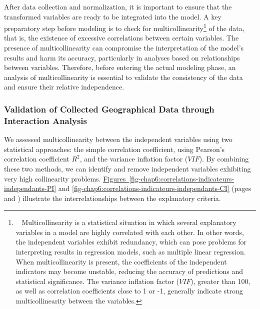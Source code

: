 \begin{refsegment}
After data collection and normalization, it is important to ensure that the transformed variables are ready to be integrated into the model. A key preparatory step before modeling is to check for multicollinearity\footnote{~
    Multicollinearity is a statistical situation in which several explanatory variables in a model are highly correlated with each other. In other words, the independent variables exhibit redundancy, which can pose problems for interpreting results in regression models, such as multiple linear regression. When multicollinearity is present, the coefficients of the independent indicators may become unstable, reducing the accuracy of predictions and statistical significance. The variance inflation factor (\(VIF\)), greater than 100, as well as correlation coefficients close to 1 or -1, generally indicate strong multicollinearity between the variables.
} of the data, that is, the existence of excessive correlations between certain variables. The presence of multicollinearity can compromise the interpretation of the model's results and harm its accuracy, particularly in analyses based on relationships between variables. Therefore, before entering the actual modeling phase, an analysis of multicollinearity is essential to validate the consistency of the data and ensure their relative independence.%

\subsubsection*{Validation of Collected Geographical Data through Interaction Analysis
    \label{chap6:methodologie-statistiques-validation}
    }

We assessed multicollinearity between the independent variables using two statistical approaches: the simple correlation coefficient, using Pearson's correlation coefficient \(R^{2}\), and the variance inflation factor (\(VIF\)). By combining these two methods, we can identify and remove independent variables exhibiting very high collinearity problems. \hyperref[fig-chap6:correlations-indicateurs-independants-PI]{Figures~\ref{fig-chap6:correlations-indicateurs-independants-PI}} and \hyperref[fig-chap6:correlations-indicateurs-independants-CI]{\ref{fig-chap6:correlations-indicateurs-independants-CI}} (pages \pageref{fig-chap6:correlations-indicateurs-independants-PI} and \pageref{fig-chap6:correlations-indicateurs-independants-CI}) illustrate the interrelationships between the explanatory criteria.%


\end{refsegment}
